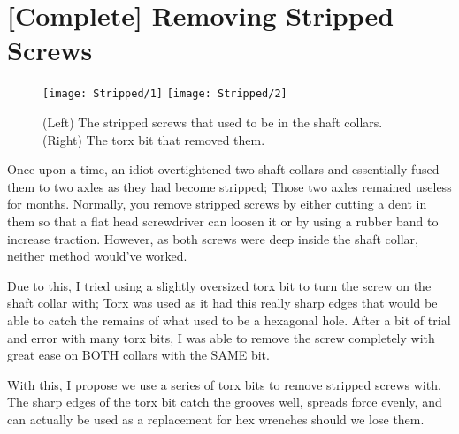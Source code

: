 \section{[Complete] Removing Stripped Screws}

\begin{figure}[h]
    \centering
    \texttt{[image: Stripped/1]}
    \texttt{[image: Stripped/2]}
    \caption{
        (Left) The stripped screws that used to be in the shaft collars. (Right) The torx bit that removed them.
    }
\end{figure}

Once upon a time, an idiot overtightened two shaft collars and essentially fused them to two axles as they had become stripped; Those two axles remained useless for months. Normally, you remove stripped screws by either cutting a dent in them so that a flat head screwdriver can loosen it or by using a rubber band to increase traction. However, as both screws were deep inside the shaft collar, neither method would've worked.

Due to this, I tried using a slightly oversized torx bit to turn the screw on the shaft collar with; Torx was used as it had this really sharp edges that would be able to catch the remains of what used to be a hexagonal hole. After a bit of trial and error with many torx bits, I was able to remove the screw completely with great ease on BOTH collars with the SAME bit.

With this, I propose we use a series of torx bits to remove stripped screws with. The sharp edges of the torx bit catch the grooves well, spreads force evenly, and can actually be used as a replacement for hex wrenches should we lose them.
